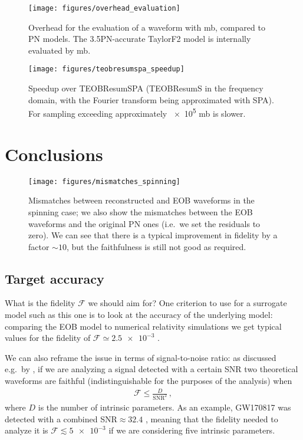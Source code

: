 \documentclass[main.tex]{subfiles}
\begin{document}
\begin{figure}[ht]
\centering
\texttt{[image: figures/overhead\_evaluation]}
\caption{Overhead for the evaluation of a waveform with \ac{mb}, compared to \ac{PN} models. 
The 3.5PN-accurate TaylorF2 model is internally evaluated by \ac{mb}.}
\label{fig:overhead_evaluation}
\end{figure}

\begin{figure}[ht]
\centering
\texttt{[image: figures/teobresumspa\_speedup]}
\caption{Speedup over TEOBResumSPA (TEOBResumS in the frequency domain, with the Fourier transform being approximated with \ac{SPA}). For sampling exceeding approximately \num{e5} \ac{mb} is slower.}
\label{fig:teobresumspa_speedup}
\end{figure}

\section{Conclusions}

\begin{figure}[ht]
\centering
\texttt{[image: figures/mismatches\_spinning]}
\caption{Mismatches between reconstructed and \ac{EOB} waveforms in the spinning case; we also show the mismatches between the \ac{EOB} waveforms and the original \ac{PN} ones (i.e.\ we set the residuals to zero). We can see that there is a typical improvement in fidelity by a factor \(\sim 10\), but the faithfulness is still not good as required.}
\label{fig:mismatches_spinning}
\end{figure}

\subsection{Target accuracy}

What is the fidelity \(\mathcal{F}\) we should aim for? 
One criterion to use for a surrogate model such as this one is to look at the accuracy of the underlying model: comparing the \ac{EOB} model to numerical relativity simulations we get typical values for the fidelity of \(\mathcal{F} \simeq \num{2.5e-3}\) \cite[]{nagarTimedomainEffectiveonebodyGravitational2018}.

We can also reframe the issue in terms of signal-to-noise ratio: as discussed e.g.\ by \textcite[]{lindblomModelWaveformAccuracy2008} \cite[]{gambaFastFaithfulFrequencydomain2020}, if we are analyzing a signal detected with a certain \ac{SNR} two theoretical waveforms are faithful (indistinguishable for the purposes of the analysis) when 
%
\begin{align}
\mathcal{F} \leq \frac{D}{\text{SNR}^2}
\,,
\end{align}
%
where \(D\) is the number of intrinsic parameters. 
As an example, GW170817 was detected with a combined SNR\(\approx 32.4\) \cite[]{abbottGW170817ObservationGravitational2017}, meaning that the fidelity needed to analyze it is \(\mathcal{F} \lesssim \num{5e-3}\) if we are considering five intrinsic parameters.
\end{document}
